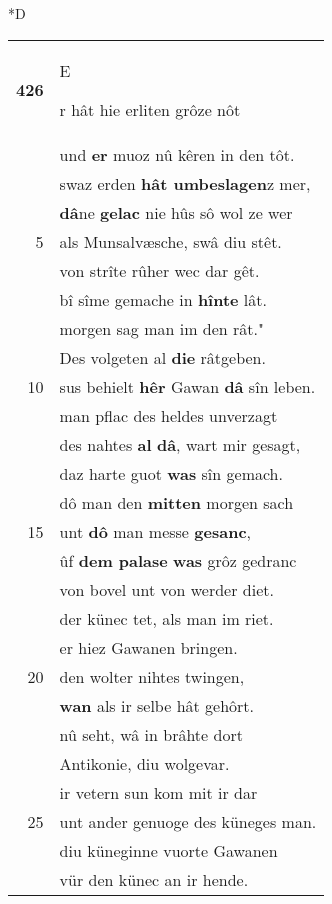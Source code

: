 \documentclass[8pt,a4paper,notitlepage]{article}
\begin{document}
\begin{table}[ht]
\begin{minipage}[t]{0.5\linewidth}
\small
\begin{center}*D
\end{center}
\begin{tabular}{rl}
\textbf{426} & \begin{large}E\end{large}r hât hie erliten grôze nôt\\ 
 & und \textbf{er} muoz nû kêren in den tôt.\\ 
 & swaz erden \textbf{hât umbeslagen}z mer,\\ 
 & \textbf{dâ}ne \textbf{gelac} nie hûs sô wol ze wer\\ 
5 & als Munsalvæsche, swâ diu stêt.\\ 
 & von strîte rûher wec dar gêt.\\ 
 & bî sîme gemache in \textbf{hînte} lât.\\ 
 & morgen sag man im den rât."\\ 
 & Des volgeten al \textbf{die} râtgeben.\\ 
10 & sus behielt \textbf{hêr} Gawan \textbf{dâ} sîn leben.\\ 
 & man pflac des heldes unverzagt\\ 
 & des nahtes \textbf{al} \textbf{dâ}, wart mir gesagt,\\ 
 & daz harte guot \textbf{was} sîn gemach.\\ 
 & dô man den \textbf{mitten} morgen sach\\ 
15 & unt \textbf{dô} man messe \textbf{gesanc},\\ 
 & ûf \textbf{dem palase} \textbf{was} grôz gedranc\\ 
 & von bovel unt von werder diet.\\ 
 & der künec tet, als man im riet.\\ 
 & er hiez Gawanen bringen.\\ 
20 & den wolter nihtes twingen,\\ 
 & \textbf{wan} als ir selbe hât gehôrt.\\ 
 & nû seht, wâ in brâhte dort\\ 
 & Antikonie, diu wolgevar.\\ 
 & ir vetern sun kom mit ir dar\\ 
25 & unt ander genuoge des küneges man.\\ 
 & diu küneginne vuorte Gawanen\\ 
 & vür den künec an ir hende.\\ 

\end{tabular}
\end{minipage}
\end{table}
\end{document}
